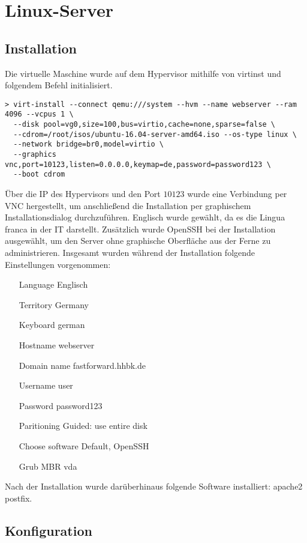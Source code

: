 \section{Linux-Server}

\subsection{Installation}

Die virtuelle Maschine wurde auf dem Hypervisor mithilfe von {\sc virtinst} und folgendem Befehl initialisiert.

\begin{lstlisting}[numbers=none]
> virt-install --connect qemu:///system --hvm --name webserver --ram 4096 --vcpus 1 \
  --disk pool=vg0,size=100,bus=virtio,cache=none,sparse=false \
  --cdrom=/root/isos/ubuntu-16.04-server-amd64.iso --os-type linux \
  --network bridge=br0,model=virtio \
  --graphics vnc,port=10123,listen=0.0.0.0,keymap=de,password=password123 \
  --boot cdrom
\end{lstlisting}

Über die IP des Hypervisors und den Port $10123$ wurde eine Verbindung per VNC hergestellt, um anschließend die Installation per graphischem Installationsdialog durchzuführen. Englisch wurde gewählt, da es die Lingua franca in der IT darstellt. Zusätzlich wurde OpenSSH bei der Installation ausgewählt, um den Server ohne graphische Oberfläche aus der Ferne zu administrieren. Insgesamt wurden während der Installation folgende Einstellungen vorgenommen:
\begin{itemize}
	\item[Language] Englisch
	\item[Territory] Germany
	\item[Keyboard] german
	\item[Hostname] webserver
	\item[Domain name] fastforward.hhbk.de
	\item[Username] user
	\item[Password] password123
	\item[Paritioning] Guided: use entire disk
	\item[Choose software] Default, OpenSSH
	\item[Grub MBR] vda
\end{itemize}

Nach der Installation wurde darüberhinaus folgende Software installiert: {\sc apache2 postfix}.

\subsection{Konfiguration}


